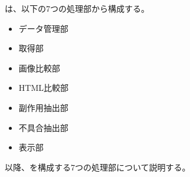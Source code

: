 \toolName は、以下の7つの処理部から構成する。
\begin{itemize}
    \item データ管理部
    \item 取得部
    \item 画像比較部
    \item HTML比較部
    \item 副作用抽出部
    \item 不具合抽出部
    \item 表示部
\end{itemize}
以降、\toolName を構成する7つの処理部について説明する。
\par

